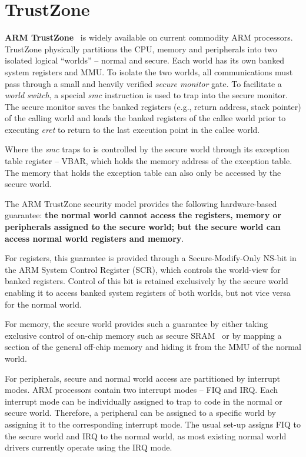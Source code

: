 
\section{TrustZone}

\textbf{ARM TrustZone}~\cite{trustzone} %
is widely available 
on current commodity ARM processors. TrustZone physically partitions the CPU, memory and peripherals 
into two isolated logical ``worlds'' -- normal and secure. 
Each world has its own banked system registers and MMU. 
To isolate the two worlds, all communications %
must pass through a small and heavily verified  
\textit{secure monitor} gate. %
To facilitate a 
\textit{world switch}, a special \textit{smc} instruction is used to trap into the secure monitor. 
The secure monitor saves the banked registers (e.g., return address, stack pointer) of the calling world 
and loads the banked registers of the callee world prior to executing \textit{eret} to return to the last 
execution point in the callee world. 

Where the \textit{smc} traps to is controlled by the secure world 
through its exception table register -- VBAR, which holds the memory address of the 
exception table. The memory that holds the exception table can also only be accessed by 
the secure world. 

The ARM TrustZone security model provides the following hardware-based guarantee: 
\textbf{the normal world cannot access the registers, memory or peripherals assigned 
to the secure world; but the secure world can access normal world registers and memory}. 

For registers, this guarantee is provided through a Secure-Modify-Only NS-bit in the ARM System 
Control Register (SCR), which controls the world-view for banked registers. Control of this bit is
retained exclusively by the secure world enabling it to access banked system registers
of both worlds, but not vice versa for the normal world. 

For memory, the secure world provides such a guarantee by either taking exclusive control of on-chip 
memory such as secure SRAM~\cite{hikey} or by mapping a section of the general off-chip memory and hiding it 
from the MMU of the normal world.

For peripherals, secure and normal world access are partitioned by interrupt modes. 
ARM processors contain two interrupt modes -- FIQ and IRQ. Each interrupt mode can be individually 
assigned to trap to code in the normal or secure world. Therefore, a peripheral can be
assigned to a specific world by assigning it to the corresponding interrupt mode. The usual set-up 
assigns FIQ to the secure world and IRQ to the normal world, as most existing normal world drivers 
currently operate using the IRQ mode.

